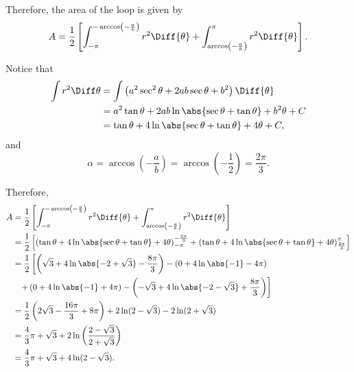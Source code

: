 \begin{enumerate}
          Therefore, the area of the loop is given by
          \[
              A = \frac{1}{2}\left[\int_{-\pi}^{-\arccos\left(-\frac{a}{b}\right)} r^2 \Diff{\theta} + \int_{\arccos\left(-\frac{a}{b}\right)}^{\pi} r^2 \Diff{\theta}\right].
          \]

          Notice that
          \begin{align*}
              \int r^2 \Diff \theta & = \int\left(a^2 \sec^2\theta + 2ab \sec\theta + b^2\right) \Diff{\theta} \\
                                    & = a^2 \tan\theta + 2ab \ln\abs{\sec\theta + \tan\theta} + b^2\theta + C  \\
                                    & = \tan\theta + 4\ln\abs{\sec\theta+\tan\theta} + 4\theta + C,
          \end{align*}
          and \[
              \alpha = \arccos\left(-\frac{a}{b}\right) = \arccos\left(-\frac{1}{2}\right) = \frac{2\pi}{3}.
          \]

          Therefore,
          \begin{align*}
              A & = \frac{1}{2}\left[\int_{-\pi}^{-\arccos\left(-\frac{a}{b}\right)} r^2 \Diff{\theta} + \int_{\arccos\left(-\frac{a}{b}\right)}^{\pi} r^2 \Diff{\theta}\right]                                                        \\
                & = \frac{1}{2} \left[\left(\tan\theta + 4\ln\abs{\sec\theta+\tan\theta} + 4\theta\right)^{-\frac{2\pi}{3}}_{-\pi} + \left(\tan\theta + 4\ln\abs{\sec\theta+\tan\theta} + 4\theta\right)^{\pi}_{\frac{2\pi}{3}}\right] \\
                & = \frac{1}{2} \left[\left(\sqrt{3} + 4\ln\abs{-2+\sqrt{3}} - \frac{8\pi}{3}\right) - \left(0 + 4\ln\abs{-1} - 4\pi\right)\right.                                                                                     \\
                & \phantom{=} \left.+ \left(0 + 4\ln\abs{-1} + 4\pi\right) - \left(-\sqrt{3} + 4\ln\abs{-2-\sqrt{3}} + \frac{8\pi}{3}\right)\right]                                                                                    \\
                & = \frac{1}{2} \left(2\sqrt{3} - \frac{16\pi}{3} + 8\pi\right) + 2\ln(2 - \sqrt{3}) - 2\ln(2 + \sqrt{3})                                                                                                              \\
                & = \frac{4}{3}\pi + \sqrt{3} + 2\ln\left(\frac{2 - \sqrt{3}}{2 + \sqrt{3}}\right)                                                                                                                                     \\
                & = \frac{4}{3}\pi + \sqrt{3} + 4\ln(2 - \sqrt{3}).
          \end{align*}
\end{enumerate}